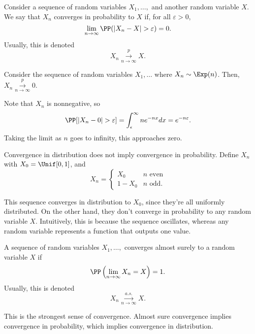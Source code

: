 \begin{definition}

Consider a sequence of random variables $X_1, \hdots,$ and another random variable $X$. We say that $X_n$ converges in probability to $X$ if, for all $\varepsilon > 0$, 
\[\lim_{n\rightarrow \infty}\PP(\vert X_n-X\vert > \varepsilon) = 0.\]
Usually, this is denoted 
\[X_n\overset{p}{\underset{n\rightarrow \infty}{\longrightarrow}} X.\]
\end{definition}

\begin{example}
\exlabel

Consider the sequence of random variables $X_1, \hdots$ where $X_n\sim \Exp(n)$. Then, $X_n\overset{p}{\underset{n\rightarrow \infty}{\longrightarrow}} 0$. 
\end{example}

Note that $X_n$ is nonnegative, so
\[\PP[\vert X_n - 0\vert > \varepsilon] = \int_{\epsilon}^{\infty}ne^{-nx}dx = e^{-n\varepsilon}.\]
Taking the limit as $n$ goes to infinity, this approaches zero.

\begin{example}
\exlabel

Convergence in distribution does not imply convergence in probability. Define $X_n$ with $X_0 = \Unif[0,1]$, and 
\[X_n = \begin{cases}X_0 & n\text{ even} \\ 1-X_0 & n\text{ odd}.\end{cases}\]
\end{example}

This sequence converges in distribution to $X_0$, since they're all uniformly distributed. On the other hand, they don't converge in probability to any random variable $X$. Intuitively, this is because the sequence oscillates, whereas any random variable represents a function that outputs one value. 

\begin{definition}

A sequence of random variables $X_1, \hdots,$ converges almost surely to a random variable $X$ if 
\[\PP\left(\lim_{n\rightarrow \infty}X_n=X\right) = 1.\]
Usually, this is denoted 
\[X_n\overset{a.s.}{\underset{n\rightarrow \infty}{\longrightarrow}} X.\]
\end{definition}

This is the strongest sense of convergence. Almost sure convergence implies convergence in probability, which implies convergence in distribution.

